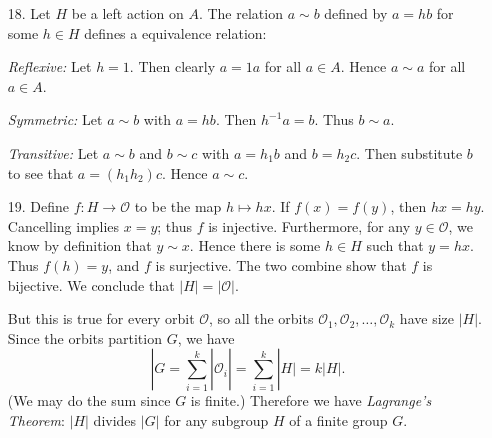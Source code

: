 \documentclass{article}
\begin{document}
\begin{enumerate}
    \item [18.] Let $H$ be a left action on $A$. The relation $a \sim b$ defined by $a = hb$ for some $h \in H$ defines a equivalence relation:
    
    \textit{Reflexive:} Let $h = 1$. Then clearly $a = 1a$ for all $a \in A$. Hence $a \sim a$ for all $a \in A$. 

    \textit{Symmetric:} Let $a \sim b$ with $a = hb$. Then $h^{-1}a = b$. Thus $b \sim a$.

    \textit{Transitive:} Let $a \sim b$ and $b \sim c$ with $a = h_1 b$ and $b = h_2 c$. Then substitute $b$ to see that $a = (h_1 h_2) c$. Hence $a \sim c$.

    \item [19.] Define $f : H \to \mathcal O$ to be the map $h \mapsto hx$. If $f(x) = f(y)$, then $hx = hy$. Cancelling implies $x = y$; thus $f$ is injective. Furthermore, for any $y \in \mathcal O$, we know by definition that $y \sim x$. Hence there is some $h \in H$ such that $y = hx$. Thus $f(h) = y$, and $f$ is surjective. The two combine show that $f$ is bijective. We conclude that $|H| = |\mathcal O|$. 
    
    But this is true for every orbit $\mathcal O$, so all the orbits $\mathcal O_1, \mathcal O_2, \dots, \mathcal O_k$ have size $|H|$. Since the orbits partition $G$, we have 
    \[|G = \sum_{i = 1}^k |\mathcal O_i| = \sum_{i = 1}^k |H| = k|H|.\]
    (We may do the sum since $G$ is finite.) Therefore we have \textit{Lagrange's Theorem}: $|H|$ divides $|G|$ for any subgroup $H$ of a finite group $G$.
\end{enumerate}
\end{document}

